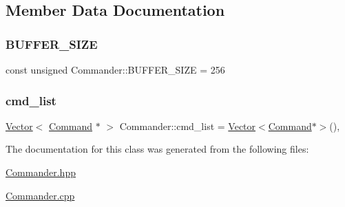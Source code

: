 \subsection{Member Data Documentation}
\mbox{\label{classCommander_a9e1b32d844b2d8080e51c4e8a4ca0442}} 
\subsubsection{\texorpdfstring{B\+U\+F\+F\+E\+R\+\_\+\+S\+I\+ZE}{BUFFER\_SIZE}}
{\footnotesize\ttfamily const unsigned Commander\+::\+B\+U\+F\+F\+E\+R\+\_\+\+S\+I\+ZE = 256\hspace{0.3cm}{\ttfamily [static]}}

\mbox{\label{classCommander_a9ea9e51d41b21de3a637090eaea7558b}} 
\subsubsection{\texorpdfstring{cmd\+\_\+list}{cmd\_list}}
{\footnotesize\ttfamily \hyperlink{classVector}{Vector}$<$ \hyperlink{classCommand}{Command} $\ast$ $>$ Commander\+::cmd\+\_\+list = \hyperlink{classVector}{Vector}$<$\hyperlink{classCommand}{Command}$\ast$$>$()\hspace{0.3cm}{\ttfamily [static]}, {\ttfamily [private]}}



The documentation for this class was generated from the following files\+:\begin{DoxyCompactItemize}
\item 
\hyperlink{Commander_8hpp}{Commander.\+hpp}\item 
\hyperlink{Commander_8cpp}{Commander.\+cpp}\end{DoxyCompactItemize}
